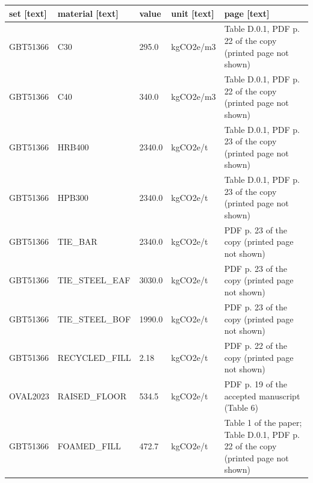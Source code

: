 \begin{tabular}{lllll}
\toprule
set [text] & material [text] & value & unit [text] & page [text] \\
\midrule
GBT51366 & C30 & 295.0 & kgCO2e/m3 & Table D.0.1, PDF p. 22 of the copy (printed page not shown) \\
GBT51366 & C40 & 340.0 & kgCO2e/m3 & Table D.0.1, PDF p. 22 of the copy (printed page not shown) \\
GBT51366 & HRB400 & 2340.0 & kgCO2e/t & Table D.0.1, PDF p. 23 of the copy (printed page not shown) \\
GBT51366 & HPB300 & 2340.0 & kgCO2e/t & Table D.0.1, PDF p. 23 of the copy (printed page not shown) \\
GBT51366 & TIE\_BAR & 2340.0 & kgCO2e/t & PDF p. 23 of the copy (printed page not shown) \\
GBT51366 & TIE\_STEEL\_EAF & 3030.0 & kgCO2e/t & PDF p. 23 of the copy (printed page not shown) \\
GBT51366 & TIE\_STEEL\_BOF & 1990.0 & kgCO2e/t & PDF p. 23 of the copy (printed page not shown) \\
GBT51366 & RECYCLED\_FILL & 2.18 & kgCO2e/t & PDF p. 22 of the copy (printed page not shown) \\
OVAL2023 & RAISED\_FLOOR & 534.5 & kgCO2e/t & PDF p. 19 of the accepted manuscript (Table 6) \\
GBT51366 & FOAMED\_FILL & 472.7 & kgCO2e/t & Table 1 of the paper; Table D.0.1, PDF p. 22 of the copy (printed page not shown) \\
\bottomrule
\end{tabular}
